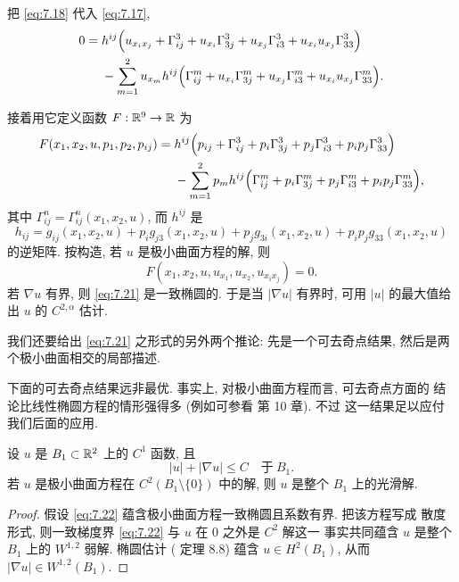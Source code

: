 把 \eqref{eq:7.18} 代入 \eqref{eq:7.17},
\begin{equation}
\begin{aligned}
0={}&h^{ij}\Bigl(u_{x_ix_j}+\Gamma_{ij}^3+u_{x_i}\Gamma_{3j}^3
+u_{x_j}\Gamma_{i3}^3+u_{x_i}u_{x_j}\Gamma_{33}^3\Bigr)\\
&-\sum_{m=1}^2u_{x_m}h^{ij}\Bigl(\Gamma_{ij}^m+u_{x_i}\Gamma_{3j}^m
+u_{x_j}\Gamma_{i3}^m+u_{x_i}u_{x_j}\Gamma_{33}^m\Bigr).
\end{aligned}
\label{eq:7.19}
\end{equation}

接着用它定义函数 $F:\mathbb{R}^9\to\mathbb{R}$ 为
\begin{equation}
\begin{aligned}
F(x_1,x_2,u,p_1,p_2,p_{ij})
={}&h^{ij}\Bigl(p_{ij}+\Gamma_{ij}^3+p_i\Gamma_{3j}^3
+p_j\Gamma_{i3}^3+p_ip_j\Gamma_{33}^3\Bigr)\\
&-\sum_{m=1}^2p_mh^{ij}\Bigl(\Gamma_{ij}^m+p_i\Gamma_{3j}^m
+p_j\Gamma_{i3}^m+p_ip_j\Gamma_{33}^m\Bigr),
\end{aligned}
\label{eq:7.20}
\end{equation}
其中 $\Gamma_{ij}^n=\Gamma_{ij}^n(x_1,x_2,u)$, 而 $h^{ij}$ 是
\[
h_{ij}=g_{ij}(x_1,x_2,u)+p_ig_{j3}(x_1,x_2,u)
+p_jg_{3i}(x_1,x_2,u)+p_ip_jg_{33}(x_1,x_2,u)
\]
的逆矩阵. 按构造, 若 $u$ 是极小曲面方程的解, 则
\begin{equation}
F(x_1,x_2,u,u_{x_1},u_{x_2},u_{x_ix_j})=0.
\label{eq:7.21}
\end{equation}
若 $\nabla u$ 有界, 则 \eqref{eq:7.21} 是一致椭圆的. 于是当
$|\nabla u|$ 有界时, 可用 $|u|$ 的最大值给出 $u$ 的 $C^{2,\alpha}$ 估计.

我们还要给出 \eqref{eq:7.21} 之形式的另外两个推论: 先是一个可去奇点结果,
然后是两个极小曲面相交的局部描述.

下面的可去奇点结果远非最优. 事实上, 对极小曲面方程而言, 可去奇点方面的
结论比线性椭圆方程的情形强得多 (例如可参看 \cite{Os2} 第 10 章). 不过
这一结果足以应付我们后面的应用.

\begin{lemma}
\label{lem:7.2}
设 $u$ 是 $B_1\subset\mathbb{R}^2$ 上的 $C^1$ 函数, 且
\begin{equation}
|u|+|\nabla u|\leq C\quad\text{于}\ B_1.
\label{eq:7.22}
\end{equation}
若 $u$ 是极小曲面方程在 $C^2(B_1\setminus\{0\})$ 中的解, 则 $u$ 是整个
$B_1$ 上的光滑解.
\end{lemma}

\begin{proof}
假设 \eqref{eq:7.22} 蕴含极小曲面方程一致椭圆且系数有界. 把该方程写成
散度形式, 则一致梯度界 \eqref{eq:7.22} 与 $u$ 在 $0$ 之外是 $C^2$ 解这一
事实共同蕴含 $u$ 是整个 $B_1$ 上的 $W^{1,2}$ 弱解. 椭圆估计
(\cite{GiTr} 定理 8.8) 蕴含 $u\in H^2(B_1)$, 从而 $|\nabla u|\in W^{1,2}(B_1)$.
\end{proof}

